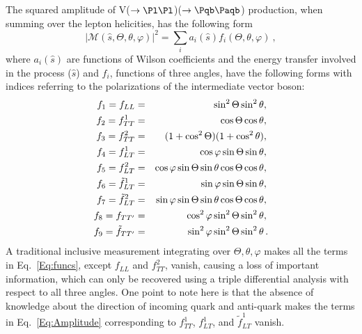 \documentclass[a4paper,11pt]{article}
\newcommand{\Pb}{{{\Pqb}}\xspace}
\newcommand{\PAb}{{{{\Paqb}}}\xspace}
\renewcommand{\PV}{{{{V}}}\xspace}
\begin{document}
The squared amplitude of \PV($\to \Pl \Pl$)\PH($\to \Pb \PAb$) production, when summing over the lepton helicities, has the following form
\begin{equation}
	|\mathcal{M} \left(\hat{s}, \Theta, \theta, \varphi \right)|^{2} = {\sum}_{i} a_i \left(\hat{s}\right) f_i \left(\Theta, \theta, \varphi \right) \ ,
\label{Eq:Amplitude}
\end{equation}
where $a_i \left(\hat{s}\right)$ are functions of Wilson coefficients and the energy transfer involved in the process ($\hat{s}$) and $f_i$, functions of three angles, have the following forms with indices referring to the polarizations of the intermediate vector boson:
\begin{eqnarray}
    f_{1} = f_{LL} &=& \sin^{2}\Theta \sin^{2}\theta,{\nonumber}\\
    f_{2} = f^1_{TT} &=& \cos\Theta \cos\theta,{\nonumber}\\
    f_{3} = f^2_{TT} &=& (1+\cos^{2}\Theta)(1+ \cos^{2}\theta),{\nonumber}\\
    f_{4} = f^1_{LT} &=& \cos\varphi \sin\Theta \sin\theta,{\nonumber}\\
    f_{5} = f^2_{LT} &=& \cos\varphi \sin\Theta \sin\theta \cos\Theta \cos\theta,{\nonumber}\\
    f_{6} = \tilde{f}^1_{LT} &=& \sin\varphi \sin\Theta \sin\theta, {\nonumber}\\
    f_{7} = \tilde{f}^2_{LT} &=& \sin\varphi \sin\Theta \sin\theta \cos\Theta \cos\theta,{\nonumber}\\
    f_{8} = f_{TT'} &=& \cos^{2}\varphi \sin^{2}{\Theta} \sin^{2}{\theta},{\nonumber}\\
    f_{9} = \tilde{f}_{TT'} &=&  \sin^{2}{\varphi} \sin^{2}{\Theta} \sin^{2}{\theta}\,	.
    \label{Eq:funcs}
\end{eqnarray}
A traditional inclusive measurement integrating over $\Theta, \theta, \varphi$ makes all the terms in Eq.~\eqref{Eq:funcs}, except $f_{LL}$ and $f^2_{TT}$, vanish, causing a loss of important information, which can only be recovered using a triple differential analysis with respect to all three angles.
One point to note here is that the absence of knowledge about the direction of incoming quark and anti-quark makes the terms in Eq.~\eqref{Eq:Amplitude} corresponding to $f^1_{TT}$, $f^1_{LT}$, and $\tilde{f}^1_{LT}$ vanish.
\end{document}
